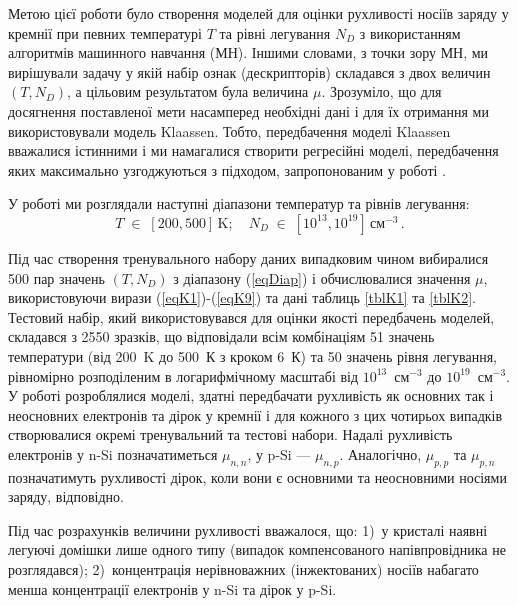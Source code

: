 \documentclass[14pt,a4paper,titlepage,oneside]{book}
\numberwithin{equation}{part}
\begin{document}
Метою цієї роботи було створення моделей для оцінки рухливості носіїв заряду у кремнії
при певних температурі $T$ та рівні легування $N_D$ з використанням алгоритмів машинного навчання (МН).
Іншими словами, з точки зору МН, ми вирішували задачу у якій набір ознак (дескрипторів) складався з двох величин $(T,N_D)$,
а цільовим результатом була величина $\mu$.
Зрозуміло, що для досягнення поставленої мети насамперед необхідні дані і для їх отримання ми використовували модель Klaassen.
Тобто, передбачення  моделі Klaassen вважалися істинними і ми намагалися створити регресійні моделі,
передбачення яких максимально узгоджуються з підходом, запропонованим у роботі \cite{KLAASSEN953}.

У роботі ми розглядали наступні діапазони температур та рівнів легування:
\begin{equation}\label{eqDiap}
  T\;\in\;[200,500]\,\text{K};\quad N_D\;\in\;[10^{13},10^{19}]\,\text{см}^{-3}\,.
\end{equation}

Під час створення тренувального набору даних випадковим чином вибиралися 500 пар значень $(T,N_D)$ з діапазону (\ref{eqDiap}) і
обчислювалися значення $\mu$, використовуючи вирази (\ref{eqK1})-(\ref{eqK9}) та дані таблиць \ref{tblK1} та \ref{tblK2}.
Тестовий набір, який використовувався для оцінки якості передбачень моделей, складався з 2550 зразків, що
відповідали всім комбінаціям 51 значень температури (від 200~K до 500~К з кроком 6~К) та 50 значень рівня легування, рівномірно розподіленим
в логарифмічному масштабі від $10^{13}$~см$^{-3}$ до $10^{19}$~см$^{-3}$.
У роботі розроблялися моделі, здатні передбачати рухливість як основних так і неосновних електронів та дірок у кремнії
і для кожного з цих чотирьох випадків створювалися окремі тренувальний та тестові набори.
Надалі рухливість електронів у n-Si позначатиметься $\mu_{n,n}$, у p-Si --- $\mu_{n,p}$.
Аналогічно, $\mu_{p,p}$ та $\mu_{p,n}$ позначатимуть рухливості дірок, коли вони є основними та неосновними носіями заряду, відповідно.

Під час розрахунків величини рухливості вважалося, що:
1)~у кристалі наявні легуючі домішки лише одного типу (випадок компенсованого напівпровідника не розглядався);
2)~концентрація нерівноважних (інжектованих) носіїв набагато менша концентрації електронів у n-Si та дірок у p-Si.
\end{document}

